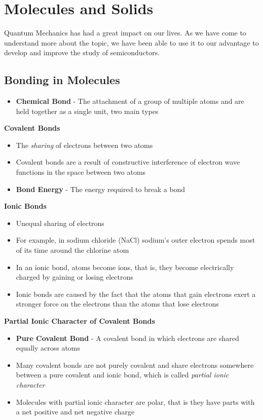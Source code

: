 \section{Molecules and Solids}
Quantum Mechanics has had a great impact on our lives. As we have come to understand more about the topic, we have been able to use it to our advantage to develop and improve the study of semiconductors. 

\subsection{Bonding in Molecules}
\begin{itemize}
    \item \textbf{Chemical Bond} - The attachment of a group of multiple atoms and are held together as a single unit, two main types
\end{itemize}

\textbf{Covalent Bonds}
\begin{itemize}
    \item The \emph{sharing} of electrons between two atoms
    \item Covalent bonds are a result of constructive interference of electron wave functions in the space between two atoms
    \item \textbf{Bond Energy} - The energy required to break a bond
\end{itemize}

\textbf{Ionic Bonds}
\begin{itemize}
    \item Unequal sharing of electrons
    \item For example, in sodium chloride (NaCl) sodium's outer electron spends most of its time around the chlorine atom 
    \item In an ionic bond, atoms become ions, that is, they become electrically charged by gaining or losing electrons
    \item Ionic bonds are caused by the fact that the atoms that gain electrons exert a stronger force on the electrons than the atoms that lose electrons
\end{itemize}

\textbf{Partial Ionic Character of Covalent Bonds}
\begin{itemize}
    \item \textbf{Pure Covalent Bond} - A covalent bond in which electrons are shared equally across atoms 
    \item Many covalent bonds are not purely covalent and share electrons somewhere between a pure covalent and ionic bond, which is called \emph{partial ionic character}
    \item Molecules with partial ionic character are polar, that is they have parts with a net positive and net negative charge
\end{itemize}

